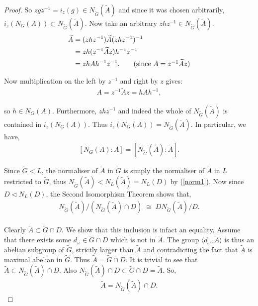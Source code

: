 \begin{proof}
So $z g z^{-1} = i_z(g) \in N_{\widetilde{G}}({\widetilde{A}})$ and since it was chosen arbitrarily, $i_z(N_G(A)) \subset N_{\widetilde{G}}({\widetilde{A}})$. Now take an arbitrary $z h z^{-1} \in N_{\widetilde{G}}({\widetilde{A}})$.
\begin{align*} {\widetilde{A}} &= (z h z^{-1}) {\widetilde{A}} (z h z^{-1})^{-1}
\\ &= z h (z^{-1} {\widetilde{A}} z) h^{-1} z^{-1}
\\ &= z h A h^{-1} z^{-1}. \tag{since $A = z^{-1} {\widetilde{A}} z$}
\end{align*}

Now multiplication on the left by $z^{-1}$ and right by $z$ gives:
\begin{align*} A = z^{-1} {\widetilde{A}} z = h A h^{-1},
\end{align*}

so $h \in N_G(A)$. Furthermore, $z h z^{-1}$ and indeed the whole of $N_{\widetilde{G}}({\widetilde{A}})$ is contained in $i_z(N_G(A))$. Thus $ i_z(N_G(A)) = N_{\widetilde{G}}({\widetilde{A}})$. In particular, we have,
\begin{align}\label{6.8iv1} [N_G(A): A] = [N_{\widetilde{G}}({\widetilde{A}}): {\widetilde{A}}].
\end{align}

Since ${\widetilde{G}} < L$, the normaliser of ${\widetilde{A}}$ in ${\widetilde{G}}$ is simply the normaliser of ${\widetilde{A}}$ in $L$ restricted to ${\widetilde{G}}$, thus $N_{\widetilde{G}}({\widetilde{A}}) < N_L({\widetilde{A}}) = N_L(D)$ by (\ref{norm1}). Now since $D \vartriangleleft N_L(D)$, the Second Isomorphism Theorem shows that,
\begin{align}\label{2iso} N_{\widetilde{G}}({\widetilde{A}})/( N_{\widetilde{G}}({\widetilde{A}}) \cap D) \; \cong \; DN_{\widetilde{G}}({\widetilde{A}}) / D.
\end{align}
\\
Clearly ${\widetilde{A}} \subset {\widetilde{G}} \cap D$. We show that this inclusion is infact an equality. Assume that there exists some $d_\omega \in  {\widetilde{G}} \cap D$ which is not in ${\widetilde{A}}$. The group $\langle d_\omega , {\widetilde{A}} \rangle$ is thus an abelian subgroup of ${\widetilde{G}}$, strictly larger than ${\widetilde{A}}$ and contradicting the fact that ${\widetilde{A}}$ is maximal abelian in ${\widetilde{G}}$. Thus ${\widetilde{A}} =  {\widetilde{G}} \cap D$. It is trivial to see that ${\widetilde{A}} \subset N_{\widetilde{G}}({\widetilde{A}}) \cap D$. Also $N_{\widetilde{G}}({\widetilde{A}}) \cap D \subset {\widetilde{G}} \cap D = {\widetilde{A}}$. So,
\begin{align}\label{parti} {\widetilde{A}} =  N_{\widetilde{G}}({\widetilde{A}}) \cap D.
\end{align}


\end{proof}

